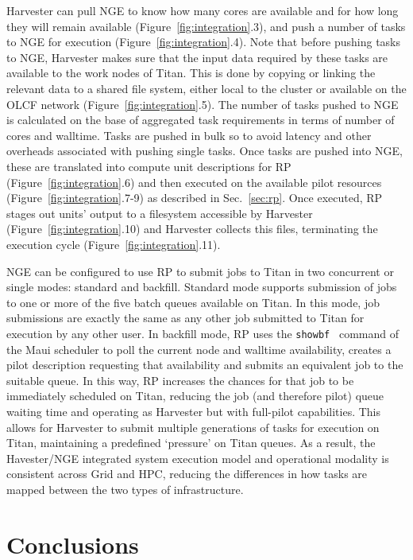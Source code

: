 \documentclass{webofc}
\begin{document}
Harvester can pull NGE to know how many cores are available and for how long
they will remain available (Figure~\ref{fig:integration}.3), and push a
number of tasks to NGE for execution (Figure~\ref{fig:integration}.4). Note
that before pushing tasks to NGE, Harvester makes sure that the input data
required by these tasks are available to the work nodes of Titan. This is
done by copying or linking the relevant data to a shared file system, either
local to the cluster or available on the OLCF network
(Figure~\ref{fig:integration}.5). The number of tasks pushed to NGE is
calculated on the base of aggregated task requirements in terms of number of
cores and walltime. Tasks are pushed in bulk so to avoid latency and other
overheads associated with pushing single tasks. Once tasks are pushed into
NGE, these are translated into compute unit descriptions for RP
(Figure~\ref{fig:integration}.6) and then executed on the available pilot
resources (Figure~\ref{fig:integration}.7-9) as described in
Sec.~\ref{sec:rp}. Once executed, RP stages out units' output to a filesystem
accessible by Harvester (Figure~\ref{fig:integration}.10) and Harvester
collects this files, terminating the execution cycle
(Figure~\ref{fig:integration}.11).

NGE can be configured to use RP to submit jobs to Titan in two concurrent or
single modes: standard and backfill. Standard mode supports submission of
jobs to one or more of the five batch queues available on Titan. In this
mode, job submissions are exactly the same as any other job submitted to
Titan for execution by any other user. In backfill mode, RP uses the
\texttt{showbf}~\cite{showbf} command of the Maui scheduler to poll the
current node and walltime availability, creates a pilot description
requesting that availability and submits an equivalent job to the suitable
queue. In this way, RP increases the chances for that job to be immediately
scheduled on Titan, reducing the job (and therefore pilot) queue waiting time
and operating as Harvester but with full-pilot capabilities. This allows for
Harvester to submit multiple generations of tasks for execution on Titan,
maintaining a predefined ‘pressure’ on Titan queues. As a result, the
Havester/NGE integrated system execution model and operational modality is
consistent across Grid and HPC, reducing the differences in how tasks are
mapped between the two types of infrastructure.


\section{Conclusions}
\end{document}
